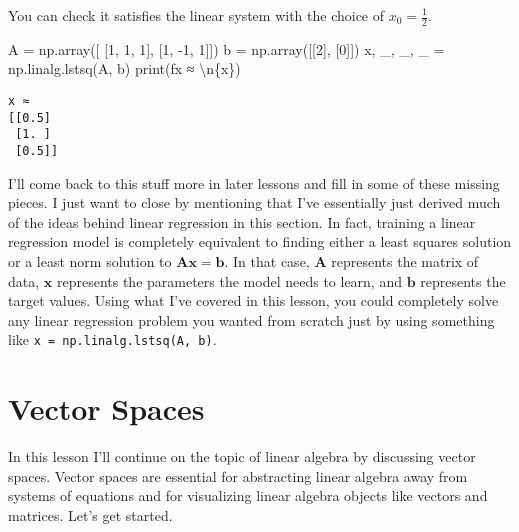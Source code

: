 \documentclass[
  letterpaper,
  DIV=11,
  numbers=noendperiod]{scrreprt}
\newenvironment{Shaded}{\begin{snugshade}}{\end{snugshade}}
\newcommand{\BuiltInTok}[1]{\textcolor[rgb]{0.00,0.23,0.31}{#1}}
\newcommand{\CharTok}[1]{\textcolor[rgb]{0.13,0.47,0.30}{#1}}
\newcommand{\DecValTok}[1]{\textcolor[rgb]{0.68,0.00,0.00}{#1}}
\newcommand{\NormalTok}[1]{\textcolor[rgb]{0.00,0.23,0.31}{#1}}
\newcommand{\OperatorTok}[1]{\textcolor[rgb]{0.37,0.37,0.37}{#1}}
\newcommand{\SpecialCharTok}[1]{\textcolor[rgb]{0.37,0.37,0.37}{#1}}
\newcommand{\SpecialStringTok}[1]{\textcolor[rgb]{0.13,0.47,0.30}{#1}}
\begin{document}
You can check it satisfies the linear system with the choice of
\(x_0 = \frac{1}{2}\).

\begin{Shaded}
\begin{Highlighting}[]
\NormalTok{A }\OperatorTok{=}\NormalTok{ np.array([}
\NormalTok{    [}\DecValTok{1}\NormalTok{, }\DecValTok{1}\NormalTok{, }\DecValTok{1}\NormalTok{], }
\NormalTok{    [}\DecValTok{1}\NormalTok{, }\OperatorTok{{-}}\DecValTok{1}\NormalTok{, }\DecValTok{1}\NormalTok{]])}
\NormalTok{b }\OperatorTok{=}\NormalTok{ np.array([[}\DecValTok{2}\NormalTok{], [}\DecValTok{0}\NormalTok{]])}
\NormalTok{x, \_, \_, \_ }\OperatorTok{=}\NormalTok{ np.linalg.lstsq(A, b)}
\BuiltInTok{print}\NormalTok{(}\SpecialStringTok{f\textquotesingle{}x ≈ }\CharTok{\textbackslash{}n}\SpecialCharTok{\{}\NormalTok{x}\SpecialCharTok{\}}\SpecialStringTok{\textquotesingle{}}\NormalTok{)}
\end{Highlighting}
\end{Shaded}

\begin{verbatim}
x ≈ 
[[0.5]
 [1. ]
 [0.5]]
\end{verbatim}

I'll come back to this stuff more in later lessons and fill in some of
these missing pieces. I just want to close by mentioning that I've
essentially just derived much of the ideas behind linear regression in
this section. In fact, training a linear regression model is completely
equivalent to finding either a least squares solution or a least norm
solution to \(\mathbf{A}\mathbf{x} = \mathbf{b}\). In that case,
\(\mathbf{A}\) represents the matrix of data, \(\mathbf{x}\) represents
the parameters the model needs to learn, and \(\mathbf{b}\) represents
the target values. Using what I've covered in this lesson, you could
completely solve any linear regression problem you wanted from scratch
just by using something like \texttt{x\ =\ np.linalg.lstsq(A,\ b)}.


\hypertarget{vector-spaces}{%
\chapter{Vector Spaces}\label{vector-spaces}}

In this lesson I'll continue on the topic of linear algebra by
discussing vector spaces. Vector spaces are essential for abstracting
linear algebra away from systems of equations and for visualizing linear
algebra objects like vectors and matrices. Let's get started.
\end{document}
